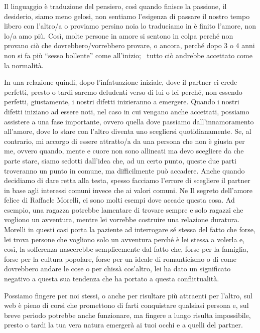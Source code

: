 \documentclass[12pt]{book} %
\begin{document}
Il linguaggio è traduzione del pensiero, così quando finisce la passione, il desiderio, siamo meno gelosi, non sentiamo
l'esigenza di passare il nostro tempo libero con l'altro/a o proviamo persino
noia lo traduciamo in è finito l'amore, non lo/a amo più. Così, molte persone in amore si sentono
in colpa perché non provano ciò che dovrebbero/vorrebbero provare, o ancora, perché dopo 3 o 4 anni non si fa più
“sesso bollente” come all'inizio; \ tutto ciò andrebbe accettato come la
normalità.

In una relazione quindi, dopo l'infatuazione iniziale, dove il partner ci crede perfetti, presto o tardi saremo
deludenti verso di lui o lei perché, non essendo perfetti, giustamente, i nostri difetti inizieranno a emergere. Quando
i nostri difetti iniziano ad essere noti, nel caso in cui vengano anche accettati, possiamo assistere a una fase
importante, ovvero quella dove passiamo dall'innamoramento all'amore, dove lo
stare con l'altro diventa uno scegliersi quotidianamente. Se, al contrario, mi accorgo di essere
attratto/a da una persona che non è giusta per me, ovvero quando, mente e cuore non sono allineati ma devo scegliere da
che parte stare, siamo sedotti dall'idea che, ad un certo punto, queste due parti troveranno un
punto in comune, ma difficilmente può accadere. Anche quando decidiamo di dare retta alla testa, spesso facciamo
l'errore di scegliere il partner in base agli interessi comuni invece che ai valori comuni. Ne Il
segreto dell'amore felice di Raffaele Morelli, ci sono molti esempi dove
accade questa cosa. Ad esempio, una ragazza potrebbe lamentare di trovare sempre e solo ragazzi che vogliono un
avventura, mentre lei vorrebbe costruire una relazione duratura. Morelli in questi casi porta la paziente ad
interrogare sé stessa del fatto che forse, lei trova persone che vogliono solo un avventura perché è lei stessa a
volerla e, così, la sofferenza nascerebbe semplicemente dal fatto che, forse per la famiglia, forse per la cultura
popolare, forse per un ideale di romanticismo o di come dovrebbero andare le cose o per chissà
cos'altro, lei ha dato un significato negativo a questa sua tendenza che ha portato a questa
conflittualità.

Possiamo fingere per noi stessi, o anche per risultare più attraenti per l'altro, sul web è pieno
di corsi che promettono di farti conquistare qualsiasi persona e, sul breve periodo potrebbe anche funzionare, ma
fingere a lungo risulta impossibile, presto o tardi la tua vera natura emergerà ai tuoi occhi e a quelli del partner.
\end{document}

